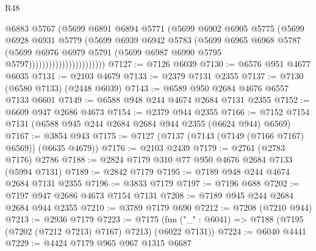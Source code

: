 \begin{lexlean}{R48}
\begin{coremodule}
                                    @6883
                                    @5767
                                    (@5699
                                      @6891
                                      @6894
                                      @5771
                                      (@5699
                                        @6902
                                        @6905
                                        @5775
                                        (@5699
                                          @6928
                                          @6931
                                          @5779
                                          (@5699
                                            @6939
                                            @6942
                                            @5783
                                            (@5699
                                              @6965
                                              @6968
                                              @5787
                                              (@5699
                                                @6976
                                                @6979
                                                @5791
                                                (@5699
                                                  @6987
                                                  @6990
                                                  @5795
                                                  @5797)))))))))))))))))))))))
@7127 := @7126 @6039
@7130 := @6576 @951 @4677 @6035
@7131 := @2103 @4679
@7133 := @2379 @7131 @2355
@7137 := @7130 (@6580 @7133) (@2448 @6039)
@7143 := @6589 @950 @2684 @4676 @6557 @7133 @6601
@7149 := @6588 @948 @244 @4674 @2684 @7131 @2355
@7152 := @6609 @947 @2686 @4673
@7154 := @2379 @944 @2355
@7166 := @7152 @7154 @7131 (@6588 @945 @244 @2684 @2684 @944 @2355 (@6624 @944) @6569)
@7167 := @3854 @943
@7175 := @7127 (@7137 (@7143 (@7149 (@7166 @7167) @6569)) (@6635 @4679))
@7176 := @2103 @2439
@7179 := @2761 (@2783 @7176) @2786
@7188 := @2824 @7179 @310 @77 @950 @4676 @2684 @7133 (@5994 @7131)
@7189 := @2842 @7179
@7195 := @7189 @948 @244 @4674 @2684 @7131 @2355
@7196 := @3833 @7179
@7197 := @7196 @688
@7202 := @7197 @947 @2686 @4673 @7154 @7131
@7208 := @7189 @945 @244 @2684 @2684 @944 @2355
@7210 := @3789 @7179 @690
@7212 := @7208 (@7210 @944)
@7213 := @2936 @7179
@7223 := @7175 (fun ("_" : @6041) => @7188 (@7195 (@7202 (@7212 @7213) @7167) @7213) (@6022 @7131))
@7224 := @6040 @4441
@7229 := @4424 @7179 @965 @967 @1315 @6687

\end{coremodule}
\end{lexlean}
